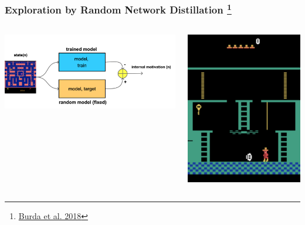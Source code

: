 \documentclass{beamer}
\begin{document}
\begin{frame}
  
  \frametitle{Exploration by Random Network Distillation \footnote{\href{https://arxiv.org/pdf/1810.12894.pdf}{Burda et al. 2018}}}

  \begin{columns}

    \begin{column}{0.5\textwidth}
      \centering
      \includegraphics[scale=0.1]{../diagrams/internal_motivation/rnd.png}
    \end{column}

    \begin{column}{0.5\textwidth}
      \centering
      \includegraphics[scale=0.3]{../images/montezuma.png}
    \end{column}
  

\end{columns}
\end{frame}
\end{document}
